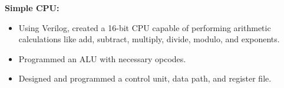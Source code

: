 \documentclass[letterpaper,9pt]{article}
\begin{document}
\noindent \textbf{Simple CPU:}
\begin{itemize}[leftmargin=*,itemsep=0pt,topsep=0pt]
    \item Using Verilog, created a 16-bit CPU capable of performing arithmetic calculations like add, subtract, multiply, divide, modulo, and exponents.
    \item Programmed an ALU with necessary opcodes.
    \item Designed and programmed a control unit, data path, and register file.
\end{itemize}
\end{document}
